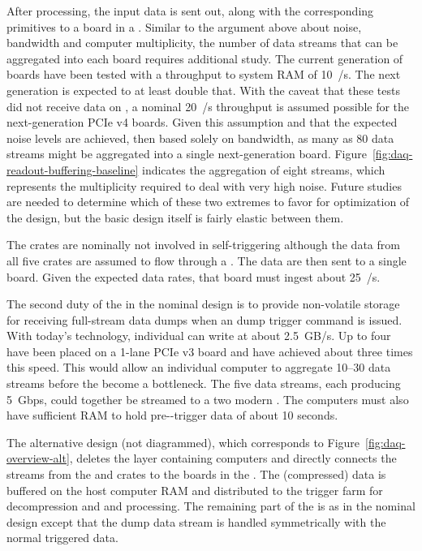 After processing, the input data is sent out, along with the
corresponding primitives to a  board in a . 
Similar to the argument above about noise, bandwidth and  computer
multiplicity, the number of  data streams that can be aggregated
into each  board requires additional study. 
The current generation of  boards have been tested with a
throughput to system RAM of \SI{10}{\GB/\s}. 
The next generation is expected to at least double that. 
With the caveat that these tests did not receive data on , a nominal
\SI{20}{\GB/\s} throughput is assumed possible for the next-generation
PCIe v4 boards. 
Given this assumption and that the expected noise levels are achieved,
then based solely on bandwidth, as many as \num{80}  data streams might be
aggregated into a single next-generation  board. 
Figure~\ref{fig:daq-readout-buffering-baseline} indicates the
aggregation of eight  streams, which represents the multiplicity
required to deal with very high noise. 
Future studies are needed to determine %
which of these two extremes to favor for optimization of the design,
but the basic design itself is
fairly elastic between them.

The  crates are nominally not involved in self-triggering although
the data from all five  crates are assumed to flow through a  . 
The data are then sent to a
single  board. 
Given the expected data rates, that  board must ingest about
\SI{25}{\GB/\s}.

The second duty of the  in the nominal design is to
provide non-volatile storage for receiving full-stream data dumps when
an  dump trigger command is issued. 
With today's technology, individual  can write at about \SI{2.5}{GB/s}. 
Up to four  have been placed on a \num{1}-lane PCIe v3 board and have
achieved about three times this speed. 
This would allow an individual  computer to aggregate \numrange{10}{30} 
data streams before the  become a bottleneck. 
The five  data streams, each producing \SI{5}{Gbps}, could together be
streamed to a two modern . %
The  computers must also have sufficient RAM to hold
pre--trigger data of about \num{10} seconds.

The alternative design (not diagrammed), which corresponds to
Figure~\ref{fig:daq-overview-alt}, deletes the layer containing 
computers and directly connects the  streams from the  and 
crates to the  boards in the . 
The  (compressed) data is buffered on the  host computer RAM
and distributed to the trigger farm for decompression and  and  processing. 
The remaining part of the  is as in the nominal
design except that the  dump data stream is handled symmetrically
with the normal triggered data.
